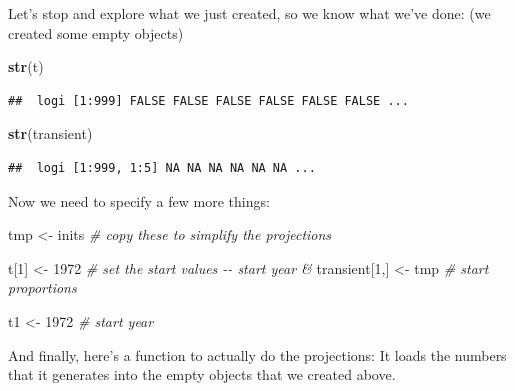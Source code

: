 \documentclass[
]{article}
\newenvironment{Shaded}{\begin{snugshade}}{\end{snugshade}}
\newcommand{\CommentTok}[1]{\textcolor[rgb]{0.56,0.35,0.01}{\textit{#1}}}
\newcommand{\DecValTok}[1]{\textcolor[rgb]{0.00,0.00,0.81}{#1}}
\newcommand{\FunctionTok}[1]{\textcolor[rgb]{0.13,0.29,0.53}{\textbf{#1}}}
\newcommand{\NormalTok}[1]{#1}
\newcommand{\OtherTok}[1]{\textcolor[rgb]{0.56,0.35,0.01}{#1}}
\begin{document}
Let's stop and explore what we just created, so we know what we've done:
(we created some empty objects)

\begin{Shaded}
\begin{Highlighting}[]
\FunctionTok{str}\NormalTok{(t)}
\end{Highlighting}
\end{Shaded}

\begin{verbatim}
##  logi [1:999] FALSE FALSE FALSE FALSE FALSE FALSE ...
\end{verbatim}

\begin{Shaded}
\begin{Highlighting}[]
\FunctionTok{str}\NormalTok{(transient)}
\end{Highlighting}
\end{Shaded}

\begin{verbatim}
##  logi [1:999, 1:5] NA NA NA NA NA NA ...
\end{verbatim}

Now we need to specify a few more things:

\begin{Shaded}
\begin{Highlighting}[]
\NormalTok{tmp }\OtherTok{\textless{}{-}}\NormalTok{ inits }\CommentTok{\# copy these to simplify the projections}

\NormalTok{t[}\DecValTok{1}\NormalTok{] }\OtherTok{\textless{}{-}} \DecValTok{1972}   \CommentTok{\# set the start values {-}{-} start year \&}
\NormalTok{transient[}\DecValTok{1}\NormalTok{,] }\OtherTok{\textless{}{-}}\NormalTok{ tmp    }\CommentTok{\# start proportions}

\NormalTok{t1 }\OtherTok{\textless{}{-}} \DecValTok{1972}   \CommentTok{\# start year}
\end{Highlighting}
\end{Shaded}

And finally, here's a function to actually do the projections: It loads
the numbers that it generates into the empty objects that we created
above.
\end{document}
